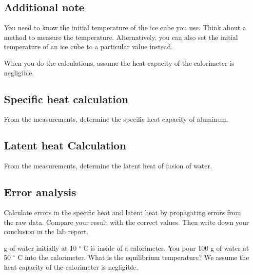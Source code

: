 \subsection*{Additional note}
You need to know the initial temperature of the ice cube you use. Think about a method to measure the temperature. Alternatively, you can also set the initial temperature of an ice cube to a particular value instead.  


\analysis
When you do the calculations, assume the heat capacity of the calorimeter is negligible. 
\subsection*{Specific heat calculation}
From the measurements, determine the specific heat capacity of aluminum.
\subsection*{Latent heat Calculation}
From the measurements, determine the latent heat of fusion of water. 
\subsection*{Error analysis}
Calculate errors in the specific heat and latent heat by propagating errors from the raw data. Compare your result with the correct values. Then write down your conclusion in the lab report. 


\prelab

 g of water initially at 10 $^\circ$ C is inside of a calorimeter. You pour 100 g of water at 50 $^\circ$ C into the calorimeter. What is the equilibrium temperature? We assume the heat capacity of the calorimeter is negligible. 

